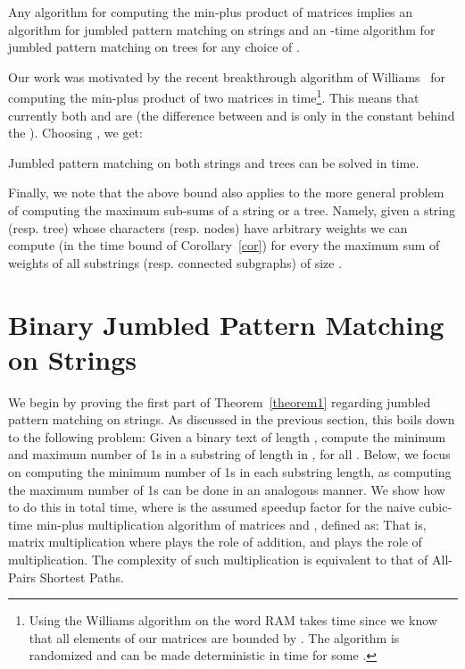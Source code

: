 \documentclass[11pt]{llncs}
\begin{document}
\begin{theorem}\label{theorem1}
Any  algorithm for computing the min-plus product of  matrices implies an
  algorithm for jumbled pattern matching on strings and an -time algorithm for  jumbled pattern matching on trees for any choice of .
\end{theorem}

\noindent Our work was motivated by the recent breakthrough algorithm of Williams~\cite{Ryan} for computing the min-plus product of two  matrices in  time\footnote{Using the Williams algorithm on the word RAM takes  time since we know that all elements of our matrices are bounded by . The algorithm is randomized and can be made deterministic  in  time for some .}. This means that currently both  and   are  (the difference between  and   is only in the constant behind the ). Choosing , we get:

\begin{corollary}\label{cor}
Jumbled pattern matching on both strings and trees can be solved in  time.
 \end{corollary}

\noindent Finally, we note that the above bound also applies to the more general problem of computing the maximum sub-sums  of a string or a tree. Namely, given a string (resp. tree) whose characters (resp. nodes) have arbitrary weights we can compute (in the time bound of Corollary~\ref{cor}) for every  the maximum sum of weights of all substrings (resp. connected subgraphs) of size .




\section{Binary Jumbled Pattern Matching on Strings}

We begin by proving the first part of Theorem~\ref{theorem1} regarding jumbled pattern matching on strings. As discussed in the previous section, this boils down to the following problem: Given a binary text  of length , compute the minimum and maximum number of 1s in a substring of length  in , for all . Below, we focus on computing the minimum number of 1s in each substring length, as computing the maximum number of 1s can be done in an analogous manner. We show how to do this in total  time, where  is the assumed speedup factor for the naive cubic-time min-plus multiplication algorithm of matrices  and , defined as:  
That is, matrix multiplication where  plays the role of addition, and  plays the role of multiplication.
The  complexity of  such multiplication is equivalent to that of All-Pairs Shortest Paths.
\end{document}
